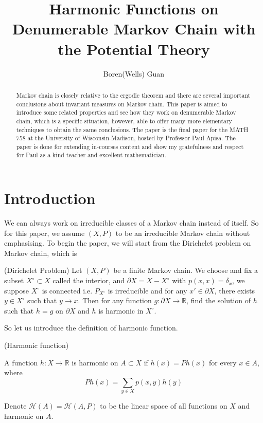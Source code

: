 \documentclass[lang=en,11pt,a4paper,citestyle =authoryear]{elegantpaper}
\title{Harmonic Functions on Denumerable Markov Chain with the Potential Theory}
\author{Boren(Wells) Guan}
\newcommand{\R}{\mathbb{R}}
\newcommand{\Har}{\mathcal{H}}
\begin{document}
\maketitle

\begin{abstract}
    Markov chain is closely relative to the ergodic theorem and there are several important conclusions about invariant measures on Markov chain. This paper is aimed to introduce some related properties and see how they work on denumerable Markov chain, which is a specific situation, however, able to offer many more elementary techniques to obtain the same conclusions. The paper is the final paper for the MATH 758 at the University of Wisconsin-Madison, hosted by Professor Paul Apisa. The paper is done for extending in-courses content and show my gratefulness and respect for Paul as a kind teacher and excellent mathematician. 
\end{abstract}

\section{Introduction}

We can always work on irreducible classes of a Markov chain instead of itself. So for this paper, we assume $(X,P)$ to be an irreducible Markov chain without emphasising. To begin the paper, we will start from the Dirichelet problem on Markov chain, which is \par
(Dirichelet Problem) Let $(X,P)$ be a finite Markov chain. We choose and fix a subset $X^{\circ} \subset X$ called the interior, and $\partial X = X - X^{\circ}$ with $p(x,x) = \delta_x$, we suppose $X^{\circ}$ is connected i.e. $P_{X^{\circ}}$ is irreducible and for any $x' \in \partial X$, there exists $y\in X^{\circ}$ such that $y\to x$. Then for any function $g:\partial X \to \R$, find the solution of $h$ such that $h = g$ on $\partial X$ and $h$ is harmonic in $X^{\circ}$.\par
So let us introduce the definition of harmonic function.\par
\begin{definition}
    (Harmonic function)\par
    A function $h:X\to \R$ is harmonic on $A\subset X$ if $h(x) = Ph(x)$ for every $x\in A$, where \[Ph(x) = \sum\limits_{y \in X}p(x,y)h(y)\]\par
    Denote $\Har(A) = \Har(A, P)$ to be the linear space of all functions on $X$ and harmonic on $A$.
\end{definition}
\end{document}

